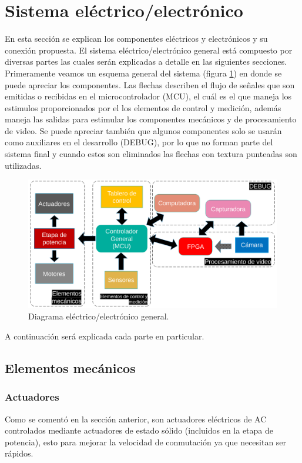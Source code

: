 \documentclass[twoside,spanish,ESP,MSc]{plantillaLabUPV}
\theoremstyle{definition}
\begin{document}
\section{Sistema eléctrico/electrónico}
En esta sección se explican los componentes eléctricos y electrónicos y su conexión propuesta. El sistema eléctrico/electrónico general está compuesto por diversas partes las cuales serán explicadas a detalle en las siguientes secciones. Primeramente veamos un esquema general del sistema (figura \ref{fig:diagramagralelectrico}) en donde se puede apreciar los componentes. Las flechas describen el flujo de señales que son emitidas o recibidas en el microcontrolador (MCU), el cuál es el que maneja los estimulos proporcionados por el los elementos de control y medición, además maneja las salidas para estimular los componentes mecánicos y de procesamiento de video. Se puede apreciar también que algunos componentes solo se usarán como auxiliares en el desarrollo (DEBUG), por lo que no forman parte del sistema final y cuando estos son eliminados las flechas con textura punteadas son utilizadas.

\begin{figure}[h]
	\centering
	\includegraphics[scale=0.5]{edrawimas/diagramagralelectrico}
	\caption{Diagrama eléctrico/electrónico general.}
	\label{fig:diagramagralelectrico}
\end{figure}

A continuación será explicada cada parte en particular.


\subsection{Elementos mecánicos}
\subsubsection{Actuadores}
Como se comentó en la sección anterior, son actuadores eléctricos de AC controlados mediante actuadores de estado sólido (incluidos en la etapa de potencia), esto para mejorar la velocidad de conmutación ya que necesitan ser rápidos.
\end{document}
